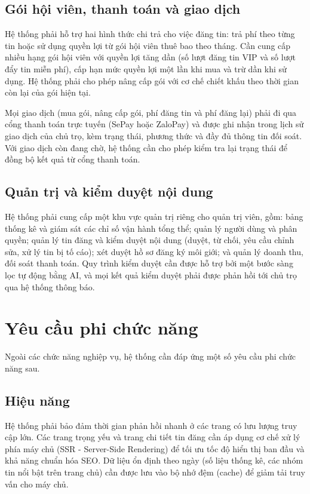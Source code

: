 \FloatBarrier
\subsection{Gói hội viên, thanh toán và giao dịch}

Hệ thống phải hỗ trợ hai hình thức chi trả cho việc đăng tin: trả phí theo từng tin hoặc sử dụng quyền lợi từ gói hội viên thuê bao theo tháng. Cần cung cấp nhiều hạng gói hội viên với quyền lợi tăng dần (số lượt đăng tin VIP và số lượt đẩy tin miễn phí), cấp hạn mức quyền lợi một lần khi mua và trừ dần khi sử dụng. Hệ thống phải cho phép nâng cấp gói với cơ chế chiết khấu theo thời gian còn lại của gói hiện tại.

Mọi giao dịch (mua gói, nâng cấp gói, phí đăng tin và phí đăng lại) phải đi qua cổng thanh toán trực tuyến (SePay hoặc ZaloPay) và được ghi nhận trong lịch sử giao dịch của chủ trọ, kèm trạng thái, phương thức và đầy đủ thông tin đối soát. Với giao dịch còn đang chờ, hệ thống cần cho phép kiểm tra lại trạng thái để đồng bộ kết quả từ cổng thanh toán.

\FloatBarrier
\subsection{Quản trị và kiểm duyệt nội dung}

Hệ thống phải cung cấp một khu vực quản trị riêng cho quản trị viên, gồm: bảng thống kê và giám sát các chỉ số vận hành tổng thể; quản lý người dùng và phân quyền; quản lý tin đăng và kiểm duyệt nội dung (duyệt, từ chối, yêu cầu chỉnh sửa, xử lý tin bị tố cáo); xét duyệt hồ sơ đăng ký môi giới; và quản lý doanh thu, đối soát thanh toán. Quy trình kiểm duyệt cần được hỗ trợ bởi một bước sàng lọc tự động bằng AI, và mọi kết quả kiểm duyệt phải được phản hồi tới chủ trọ qua hệ thống thông báo.

\section{Yêu cầu phi chức năng}

Ngoài các chức năng nghiệp vụ, hệ thống cần đáp ứng một số yêu cầu phi chức năng sau.

\FloatBarrier
\subsection{Hiệu năng}

Hệ thống phải bảo đảm thời gian phản hồi nhanh ở các trang có lưu lượng truy cập lớn. Các trang trọng yếu và trang chi tiết tin đăng cần áp dụng cơ chế xử lý phía máy chủ (SSR - Server-Side Rendering) để tối ưu tốc độ hiển thị ban đầu và khả năng chuẩn hóa SEO. Dữ liệu ổn định theo ngày (số liệu thống kê, các nhóm tin nổi bật trên trang chủ) cần được lưu vào bộ nhớ đệm (cache) để giảm tải truy vấn cho máy chủ.

